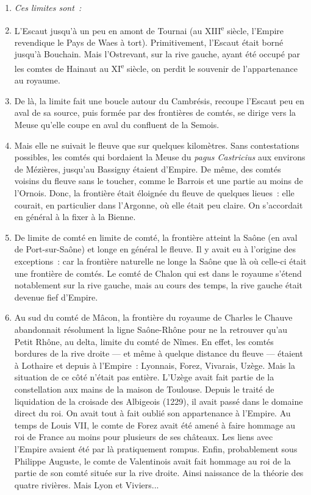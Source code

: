 \documentclass[french,twoside]{book} %
\newlength{\listmod}
\newcommand{\listhead}[1]{\hspace{-1\listmod}\emph{#1}}
\begin{document}
\begin{enumerate}[itemsep=0pt,]
\item[]\listhead{Ces limites sont :}
\item L’Escaut jusqu’à un peu en amont de Tournai (au XIII\textsuperscript{e} siècle, l’Empire revendique le Pays de Waes à tort). Primitivement, l’Escaut était borné jusqu’à Bouchain. Mais l’Ostrevant, sur la rive gauche, ayant été occupé par les comtes de Hainaut au XI\textsuperscript{e} siècle, on perdit le souvenir de l’appartenance au royaume.
\item De là, la limite fait une boucle autour du Cambrésis, recoupe l’Escaut peu en aval de sa source, puis formée par des frontières de comtés, se dirige vers la Meuse qu’elle coupe en aval du confluent de la Semois.
\item Mais elle ne suivait le fleuve que sur quelques kilomètres. Sans contestations possibles, les comtés qui bordaient la Meuse du {\itshape pagus Castricius} aux environs de Mézières, jusqu’au Bassigny étaient d’Empire. De même, des comtés voisins du fleuve sans le toucher, comme le Barrois et une partie au moins de l’Ornois. Donc, la frontière était éloignée du fleuve de quelques lieues : elle courait, en particulier dans l’Argonne, où elle était peu claire. On s’accordait en général à la fixer à la Bienne.
\item De limite de comté en limite de comté, la frontière atteint la Saône (en aval de Port-sur-Saône) et longe en général le fleuve. Il y avait eu à l’origine des exceptions : car la frontière naturelle ne longe la Saône que là où celle-ci était une frontière de comtés. Le comté de Chalon qui est dans le royaume s’étend notablement sur la rive gauche, mais au cours des temps, la rive gauche était devenue fief d’Empire.
\item Au sud du comté de Mâcon, la frontière du royaume de Charles le Chauve abandonnait résolument la ligne Saône-Rhône pour ne la retrouver qu’au Petit Rhône, au delta, limite du comté de Nîmes. En effet, les comtés bordures de la rive droite — et même à quelque distance du fleuve — étaient à Lothaire et depuis à l’Empire : Lyonnais, Forez, Vivarais, Uzège. Mais la situation de ce côté n’était pas entière. L’Uzège avait fait partie de la constellation aux mains de la  
\label{p8} maison de Toulouse. Depuis le traité de liquidation de la croisade des Albigeois (1229), il avait passé dans le domaine direct du roi. On avait tout à fait oublié son appartenance à l’Empire. Au temps de Louis VII, le comte de Forez avait été amené à faire hommage au roi de France au moins pour plusieurs de ses châteaux. Les liens avec l’Empire avaient été par là pratiquement rompus. Enfin, probablement sous Philippe Auguste, le comte de Valentinois avait fait hommage au roi de la partie de son comté située sur la rive droite. Ainsi naissance de la théorie des quatre rivières. Mais Lyon et Viviers...

\end{enumerate}
\end{document}
